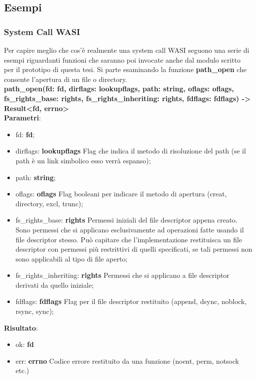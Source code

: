 \subsection{Esempi}
\subsubsection{System Call WASI}
Per capire meglio che cos'è realmente una system call WASI seguono una serie di esempi riguardanti funzioni che saranno poi invocate anche dal modulo scritto per il prototipo di questa tesi.\cite*{wasi:api}
Si parte esaminando la funzione \textbf{path\_open} che consente l'apertura di un file o directory.
\\\textbf{path\_open(fd: fd, dirflags: lookupflags, path: string, oflags: oflags, fs\_rights\_base: rights, fs\_rights\_inheriting: rights, fdflags: fdflags) -> Result<fd, errno>}
\\\textbf{Parametri}:
\begin{itemize}
        \item fd: \textbf{fd};
        \item dirflags: \textbf{lookupflags} Flag che indica il metodo di risoluzione del path (se il path è un link simbolico esso verrà espanso);
        \item path: \textbf{string};
        \item oflags: \textbf{oflags} Flag booleani per indicare il metodo di apertura (creat, directory, excl, trunc);
        \item fs\_rights\_base: \textbf{rights} Permessi iniziali del file descriptor appena creato. Sono permessi che si applicano esclusivamente ad operazioni fatte usando il file descriptor stesso. Può capitare che l'implementazione restituisca un file descriptor con permessi più restrittivi di quelli specificati, se tali permessi non sono applicabili al tipo di file aperto;
        \item fs\_rights\_inheriting: \textbf{rights} Permessi che si applicano a file descriptor derivati da quello iniziale;
        \item fdflags: \textbf{fdflags} Flag per il file descriptor restituito (append, dsync, noblock, rsync, sync);
\end{itemize}
\textbf{Risultato}:
\begin{itemize}
        \item ok: \textbf{fd} 
        \item err: \textbf{errno} Codice errore restituito da una funzione (noent, perm, notsock etc.)
\end{itemize}
